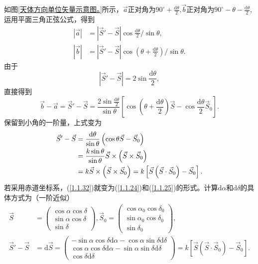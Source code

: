 \documentclass[11pt, a4paper, oneside]{ctexart}
\numberwithin{equation}{subsection}
\begin{document}
如图\ref{天体方向单位矢量示意图。}所示，$\vec{a}$正对角为$90^{\circ}+\frac{\mathrm{d}\theta}{2}$,$\vec{b}$正对角为$90^{\circ}-\theta-\frac{\mathrm{d}\theta}{2}$,运用平面三角正弦公式，得到
\begin{align}
\left\vert{}\vec a\right\vert{}&=\left\vert{}\vec S'-\vec S\right\vert{}\cos\frac{\mathrm{d}\theta}{2}/\sin\theta,\\
\left\vert{}\vec b\right\vert{}&=\left\vert{}\vec S'-\vec S\right\vert{}\cos\left(\theta+\frac{\mathrm{d}\theta}{2}\right)/\sin\theta.
\end{align}
由于
\begin{equation}
\left\vert{}\vec S'-\vec S\right\vert{}=2\sin\frac{\mathrm{d}\theta}{2},
\end{equation}
直接得到
\begin{equation}
\vec{b}-\vec{a}=\vec{S}'-\vec{S}=\frac{2\sin\frac{\mathrm{d}\theta}{2}}{\sin\theta}\left[\cos\left(\theta+\frac{\mathrm{d}\theta}{2}\right)\vec{S}-\cos\frac{\mathrm{d}\theta}{2}\vec{S}_{0}\right].
\end{equation}
保留到小角的一阶量，上式变为
\begin{align}
\vec{S}'-\vec{S}&=\frac{\mathrm{d}\theta}{\sin\theta}\left(\cos\theta\vec{S}-\vec{S}_{0}\right)\notag\\
&=\frac{k\sin\theta}{\sin\theta}\vec{S}\times\left(\vec{S}\times\vec{S}_{0}\right)\notag\\
&=k\vec{S}\times\left(\vec{S}\times\vec{S}_{0}\right)=k\left[\vec{S}\left(\vec{S}\cdot\vec{S}_{0}\right)-\vec{S}_{0}\right].\label{1.1.32}
\end{align}
若采用赤道坐标系，(\ref{1.1.32})就变为(\ref{1.1.24})和(\ref{1.1.25})的形式。计算$\mathrm{d}\alpha$和$\mathrm{d}\delta{}$的具体方式为（一阶近似）
\begin{align}
\vec S&=\begin{pmatrix}
\cos\alpha\cos\delta\\
\sin\alpha\cos\delta\\
\sin\delta
\end{pmatrix},
\vec S_{0}=\begin{pmatrix}
\cos\alpha_{0}\cos\delta_{0}\\
\sin\alpha_{0}\cos\delta_{0}\\
\sin\delta_{0}
\end{pmatrix},\\
\vec S'-\vec S&=\mathrm{d}\vec S=\begin{pmatrix}
-\sin\alpha\cos\delta\mathrm{d}\alpha-\cos\alpha\sin\delta\mathrm{d}\delta\\
\cos\alpha\cos\delta\mathrm{d}\alpha-\sin\alpha\sin\delta\mathrm{d}\delta\\
\cos\delta\mathrm{d}\delta
\end{pmatrix}=k\left[\vec{S}\left(\vec{S}\cdot\vec{S}_{0}\right)-\vec{S}_{0}\right].
\end{align}
\end{document}
